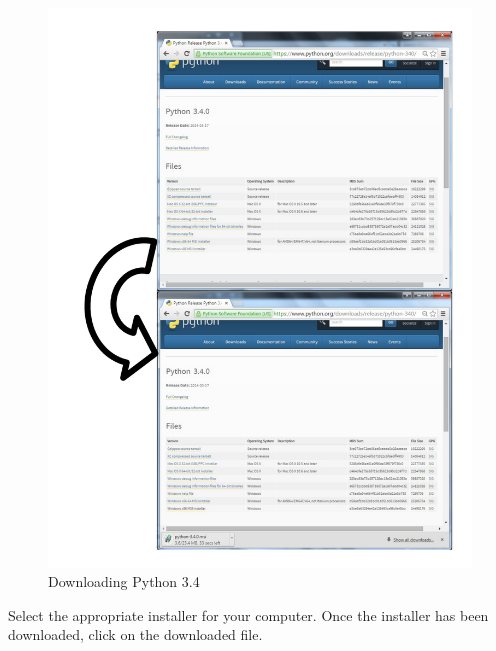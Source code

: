 \begin{figure}[H]
    \includegraphics[width=\textwidth]{./Manual/Images/DownloadingPython.pdf}
    \caption{Downloading Python 3.4} \label{fig:DownloadingPython}
\end{figure}

Select the appropriate installer for your computer. Once the installer has been downloaded, click on the downloaded file.

